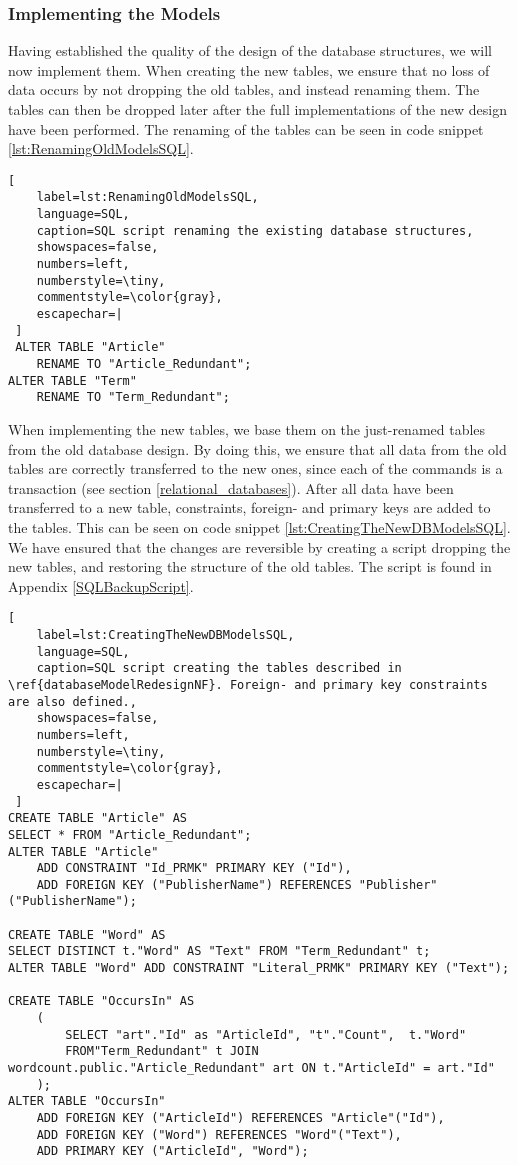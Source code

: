 \subsubsection*{Implementing the Models}\label{implementing_new_WC_DB_models}
Having established the quality of the design of the database structures, we will now implement them.
When creating the new tables, we ensure that no loss of data occurs by not dropping the old tables, and instead renaming them. 
The tables can then be dropped later after the full implementations of the new design have been performed.
The renaming of the tables can be seen in code snippet \ref{lst:RenamingOldModelsSQL}.

\begin{lstlisting}[
    label=lst:RenamingOldModelsSQL,
    language=SQL,
    caption=SQL script renaming the existing database structures,
    showspaces=false,
    numbers=left,
    numberstyle=\tiny,
    commentstyle=\color{gray},
    escapechar=|
 ]
 ALTER TABLE "Article"
    RENAME TO "Article_Redundant";
ALTER TABLE "Term"
    RENAME TO "Term_Redundant";
\end{lstlisting}

When implementing the new tables, we base them on the just-renamed tables from the old database design.
By doing this, we ensure that all data from the old tables are correctly transferred to the new ones, since each of the commands is a transaction (see section \ref{relational_databases}).
After all data have been transferred to a new table, constraints, foreign- and primary keys are added to the tables. 
This can be seen on code snippet \ref{lst:CreatingTheNewDBModelsSQL}.
We have ensured that the changes are reversible by creating a script dropping the new tables, and restoring the structure of the old tables.
The script is found in Appendix \ref{SQLBackupScript}.

\begin{lstlisting}[
    label=lst:CreatingTheNewDBModelsSQL,
    language=SQL,
    caption=SQL script creating the tables described in \ref{databaseModelRedesignNF}. Foreign- and primary key constraints are also defined.,
    showspaces=false,
    numbers=left,
    numberstyle=\tiny,
    commentstyle=\color{gray},
    escapechar=|
 ]
CREATE TABLE "Article" AS
SELECT * FROM "Article_Redundant";
ALTER TABLE "Article"
    ADD CONSTRAINT "Id_PRMK" PRIMARY KEY ("Id"),
    ADD FOREIGN KEY ("PublisherName") REFERENCES "Publisher"("PublisherName");

CREATE TABLE "Word" AS
SELECT DISTINCT t."Word" AS "Text" FROM "Term_Redundant" t;
ALTER TABLE "Word" ADD CONSTRAINT "Literal_PRMK" PRIMARY KEY ("Text");

CREATE TABLE "OccursIn" AS
    (
        SELECT "art"."Id" as "ArticleId", "t"."Count",  t."Word"
        FROM"Term_Redundant" t JOIN wordcount.public."Article_Redundant" art ON t."ArticleId" = art."Id"
    );
ALTER TABLE "OccursIn"
    ADD FOREIGN KEY ("ArticleId") REFERENCES "Article"("Id"),
    ADD FOREIGN KEY ("Word") REFERENCES "Word"("Text"),
    ADD PRIMARY KEY ("ArticleId", "Word");
\end{lstlisting}

